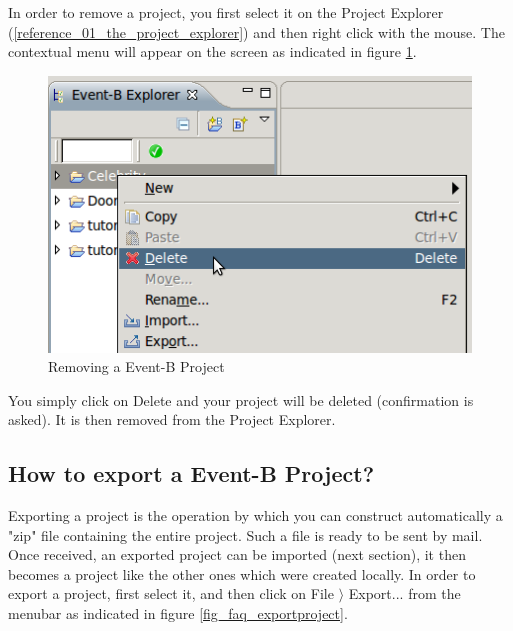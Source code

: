 In order to remove a project, you first select it on the \textsf{Project Explorer} (\ref{reference_01_the_project_explorer}) and then right click with the mouse. The contextual menu will appear on the screen as indicated in figure \ref{fig_faq_removeproject}.

\begin{figure}[!h]
\begin{center}
	\includegraphics{img/faq/faq_removeproject.png}
	\caption{Removing a Event-B Project}
	\label{fig_faq_removeproject}
\end{center}
\end{figure}

You simply click on Delete and your project will be deleted (confirmation is asked). It is then removed from the \textsf{Project Explorer}.

\subsection{How to export a Event-B Project?}


Exporting a project is the operation by which you can construct automatically a "zip" file containing the entire project. Such a file is ready to be sent by mail. Once received, an exported project can be imported (next section), it then becomes a project like the other ones which were created locally. In order to export a project, first select it, and then click on \textsf{File $\rangle$ Export...} from the menubar as indicated in figure \ref{fig_faq_exportproject}. 

